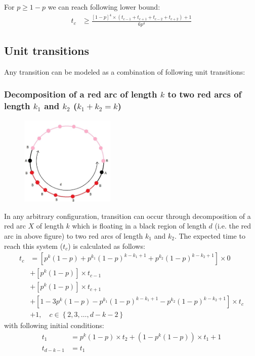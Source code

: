 \documentclass[]{book}
\theoremstyle{definition}
\begin{document}
For $p \ge 1-p$ we can reach following lower bound:
\begin{equation}
\begin{split}
    t_c & \ge \frac{\left[ 1-p \right]^4 \times \left( t_{c-1} + t_{c+1} + t_{c-2} + t_{c+2} \right) + 1}{6p^4}
\end{split}
\end{equation}

\subsection{Unit transitions}
Any transition can be modeled as a combination of following unit transitions:
\subsubsection{Decomposition of a red arc of length $k$ to two red arcs of length $k_1$ and $k_2$ ($k_1 + k_2 = k$)}
\begin{figure}[H]
    \centering\includegraphics[width=0.4\textwidth]{figures/arc decomposition.jpg}
    \caption{}
\end{figure}
In any arbitrary configuration, transition can occur through decomposition of a red arc $X$ of length $k$ which is floating in a black region of length $d$ (i.e. the red arc in above figure) to two red arcs of length $k_1$ and $k_2$. The expected time to reach this system ($t_c$) is calculated as follows:
\begin{equation}
\begin{split}
    t_c &= \left[ p^k\left( 1-p \right) + p^{k_1}\left(1-p\right)^{k-k_1+1} + p^{k_2}\left(1-p\right)^{k-k_2+1} \right] \times 0 \\
    &+ \left[ p^k\left( 1-p \right) \right] \times t_{c-1} \\
    &+ \left[ p^k\left( 1-p \right) \right] \times t_{c+1} \\
    &+ \left[1 - 3p^k\left( 1-p \right) - p^{k_1}\left(1-p\right)^{k-k_1+1} - p^{k_2}\left(1-p\right)^{k-k_2+1} \right] \times t_c \\
    &+ 1, \quad c \in \left\{2, 3, \hdots, d-k-2 \right\}
\end{split}
\end{equation}
with following initial conditions:
\begin{equation}
\begin{split}
    t_1 &= p^k\left( 1-p \right) \times t_2 + \left( 1-p^k\left( 1-p \right) \right) \times t_1 + 1 \\
    t_{d-k-1} &= t_1
\end{split}
\end{equation}
\end{document}
